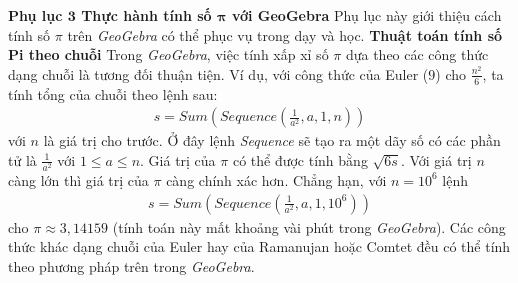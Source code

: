 \begin{multicols}{2}
\begin{figure}[H]
		\vspace*{-10pt}
	\end{figure}
	\textbf{\color{lichsutoanhoc}Phụ lục $\pmb{3}$ Thực hành tính số $\pmb{\pi}$  với GeoGebra}
	\vskip 0.1cm
	Phụ lục này giới thiệu cách tính số $\pi$ trên \textit{GeoGebra} có thể phục vụ trong dạy và học.
	\vskip 0.1cm
	\textbf{\color{lichsutoanhoc}Thuật toán tính số Pi theo chuỗi} Trong \textit{GeoGebra}, việc tính xấp xỉ số $\pi$ dựa theo các công thức dạng chuỗi là tương đối thuận tiện. Ví dụ, với công thức của Euler ($9$) cho $\frac{n^2}{6}$, ta tính tổng của chuỗi theo lệnh sau:
	\begin{align*}
		s = Sum\left( {Sequence\left( {\frac{1}{{{a^2}}},a,1,n} \right)} \right)
	\end{align*}
	với $n$ là giá trị cho trước. Ở đây lệnh \textit{Sequence} sẽ tạo ra một dãy số có các phần tử là $\frac{1}{a^2}$ với  $1 \le a \le n$. Giá trị của $\pi$  có thể được tính bằng $\sqrt{6s}$. Với giá trị $n$ càng lớn thì giá trị của $\pi$  càng chính xác hơn. Chẳng hạn, với $n = 10^6$  lệnh
	\begin{align*}
		s = Sum\left( {Sequence\left( {\frac{1}{{{a^2}}},a,1,10^6} \right)} \right)
	\end{align*}
	cho $\pi \approx 3{,}14159$ (tính toán này mất khoảng vài phút trong \textit{GeoGebra}). Các công thức khác dạng chuỗi của Euler hay của Ramanujan hoặc Comtet đều có thể tính theo phương pháp trên trong \textit{GeoGebra}.

\end{multicols}
